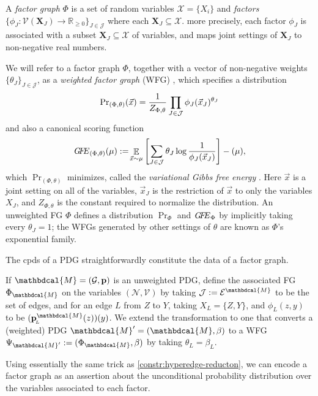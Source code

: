 \documentclass[letterpaper]{article} %
\theoremstyle{plain}
\theoremstyle{definition}
\theoremstyle{remark}
\let\H\relax
\DeclareMathOperator{\H}{\mathrm{H}} %
\DeclareMathOperator*{\E}{\mathbb{E}} %
\newcommand\mat[1]{\mathbf{#1}}
\newcommand{\dg}[1]{\mathbdcal{#1}}
\newcommand\GFE{\mathit{G\mkern-4mu F\mkern-4.5mu E}}
\newcommand{\bp}[1][L]{\mat{p}_{\!_{#1}\!}}
\newcommand{\V}{\mathcal V}
\newcommand{\N}{\mathcal N}
\newcommand{\Ed}{\mathcal E}
\newcommand{\Gr}{\mathcal G}
\newcommand{\nvvars}[1][\N,\V]{(#1)}
\newcommand{\WFGof}[1]{\Psi_{{#1}}}
\newcommand{\FGof}[1]{\Phi_{{#1}}}
\newcommand{\ed}[3]{#2
	\overset{\smash{\mskip-5mu\raisebox{-1pt}{$\scriptscriptstyle
				#1$}}}{\rightarrow} #3}
\begin{document}
	\begin{defn}
		A \emph{factor graph} $\Phi$ is a 
		set
		of random variables
		$\mathcal X = \{X_i\}$ and \emph{factors}
		$\{\phi_J\colon \V(\mat X_J) \to \mathbb R_{\geq0}\}_{J \in
			\mathcal J }$
		where each $\mat X_J \subseteq \mathcal X$.  
		more precisely, each factor $\phi_J$ is associated with a subset
		$\mat X_J\subseteq \mathcal{X}$ of variables, and maps
		joint settings of $\mat X_J$ to non-negative real numbers.
	\end{defn}
	We will refer to a factor graph $\Phi$,
	together with a vector of non-negative weights $\{ \theta_J \}_{J \in \mathcal J}$,
	as a \emph{weighted factor graph} (WFG) , which 
	specifies a distribution 
	\[ {\Pr}_{(\Phi,\theta)}(\vec x)
		= \frac{1}{Z_{\Phi,\theta}} \prod_{J \in \cal J} \phi_J(\vec
		x_J)^{\theta_J} \]
	and also a canonical scoring function 
	\begin{equation}
		\GFE_{(\Phi,\theta)}(\mu)
		:= \!\E_{\vec x\sim\mu}\left[  \sum_{J \in
			\cal J} \theta_J \log\frac1{\phi_J(\vec
			x_J)}\right] - \H(\mu)  , 
		\label{eqn:free-energy}
	\end{equation}
	which $\Pr_{(\Phi,\theta)}$ minimizes, called the \emph{variational Gibbs free energy}
	\cite{mezard2009information}. 
	Here $\vec{x}$ is a joint setting on all of the variables,
	$\vec{x}_J$ is the restriction of $\vec{x}$ to only the
	variables $X_J$, and $Z_{\Phi,\theta}$ is the constant required to
	normalize the distribution. 
	An unweighted FG $\Phi$ defines a distribution $\Pr_\Phi$ and $\GFE_{\Phi}$ by implicitly taking every $\theta_J = 1$;
	the WFGs generated by other settings of $\theta$ are known as $\Phi$'s exponential family.
	
	The cpds of a PDG straightforwardly constitute the data of a factor graph. 
	
\begin{defn}[PDG to FG]\label{def:PDG2fg}
	If $\dg M = (\Gr, \mat p)$ is an unweighted PDG, define   
	the associated FG $\FGof{\dg M}$ on the 
	variables $\nvvars$ by
	taking $\mathcal J := \Ed^{\dg M}$ to be the set of edges, %
	and for an edge $L$ from $Z$ to $Y$, taking
	$X_{L} = \{Z,Y\}$, and $\phi_L(z,y)$ to be $(\bp^{\dg M}(z))(y)$.
	We extend the transformation to one that converts a (weighted)
	PDG $\dg M' = (\dg M, \beta)$ to a WFG $\WFGof{\dg M'} := (\FGof{\dg M}, \beta)$ by taking $\theta_L = \beta_L$.
\end{defn}
	Using essentially the same trick as \cref{constr:hyperedge-reducton},
	we can encode a factor graph as an assertion about the unconditional
	probability distribution over the variables associated to each
	factor.  
	
\end{document}
